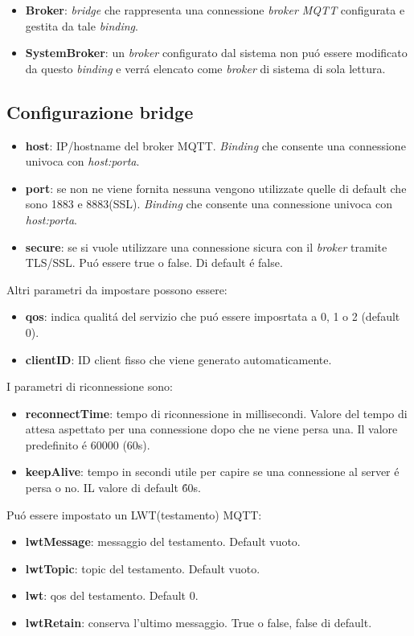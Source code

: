 \begin{itemize}
    \item \textbf{Broker}: {\em bridge} che rappresenta una connessione {\em broker MQTT} configurata e gestita da tale {\em binding}.
    \item \textbf{SystemBroker}: un {\em broker} configurato dal sistema non pu\'o essere modificato da questo {\em binding} e verr\'a elencato come {\em broker} di sistema di sola lettura.
\end{itemize}

\subsection{Configurazione bridge}
\begin{itemize}
    \item \textbf{host}: IP/hostname del broker MQTT. {\em Binding} che consente una connessione univoca con {\em host:porta}.
    \item \textbf{port}: se non ne viene fornita nessuna vengono utilizzate quelle di default che sono 1883 e 8883(SSL). {\em Binding} che consente una connessione univoca con {\em host:porta}.
    \item \textbf{secure}: se si vuole utilizzare una connessione sicura con il {\em broker} tramite TLS/SSL. Pu\'o essere true o false. Di default \'e false.
\end{itemize}

Altri parametri da impostare possono essere:
\begin{itemize}
    \item \textbf{qos}: indica qualit\'a del servizio che pu\'o essere imposrtata a 0, 1 o 2 (default 0).
    \item \textbf{clientID}: ID client fisso che viene generato automaticamente.
\end{itemize}

I parametri di riconnessione sono:
\begin{itemize}
    \item \textbf{reconnectTime}: tempo di riconnessione in millisecondi. Valore del tempo di attesa aspettato per una connessione dopo che ne viene persa una. Il valore predefinito \'e 60000 (60s).
    \item \textbf{keepAlive}: tempo in secondi utile per capire se una connessione al server \'e persa o no. IL valore di default \' 60s.
\end{itemize}

Pu\'o essere impostato un LWT(testamento) MQTT:
\begin{itemize}
    \item \textbf{lwtMessage}: messaggio del testamento. Default vuoto.
    \item \textbf{lwtTopic}: topic del testamento. Default vuoto.
    \item \textbf{lwt}: qos del testamento. Default 0.
    \item \textbf{lwtRetain}: conserva l'ultimo messaggio. True o false, false di default.
\end{itemize}


